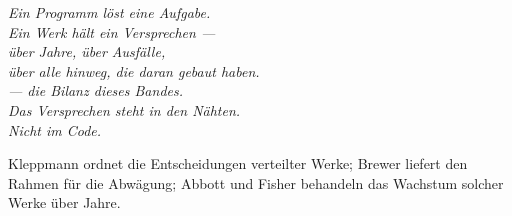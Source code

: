\begin{merksatz}
\begin{warnung}
\begin{center}
\begin{minipage}{0.88\textwidth}
\end{minipage}
\end{center}
\end{warnung}
\end{merksatz}

\bigskip
\begin{flushright}
\itshape\color{grau}
Ein Programm löst eine Aufgabe.\\
Ein Werk hält ein Versprechen ---\\
über Jahre, über Ausfälle,\\
über alle hinweg, die daran gebaut haben.\\[10pt]
\normalfont\color{grau}\upshape
--- die Bilanz dieses Bandes.\\
\itshape Das Versprechen steht in den Nähten.\\
Nicht im Code.
\end{flushright}
\vspace{6pt}
\noindent Kleppmann ordnet die Ent\-schei\-dun\-gen ver\-teil\-ter Werke; Brewer liefert den Rahmen für die Ab\-wä\-gung; Abbott und Fisher behandeln das Wachs\-tum solcher Werke über Jahre.
